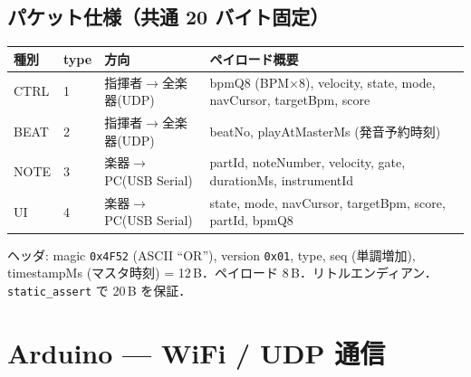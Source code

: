 \documentclass[uplatex,dvipdfmx,a4paper,10pt]{jsarticle}
\begin{document}
\subsection{パケット仕様（共通 20 バイト固定）}

\begin{tabularx}{\textwidth}{lllX}
\toprule
種別 & type & 方向 & ペイロード概要 \\
\midrule
CTRL & 1 & 指揮者$\to$全楽器(UDP) & bpmQ8 (BPM$\times$8), velocity, state, mode, navCursor, targetBpm, score \\
BEAT & 2 & 指揮者$\to$全楽器(UDP) & beatNo, playAtMasterMs (発音予約時刻) \\
NOTE & 3 & 楽器$\to$PC(USB Serial) & partId, noteNumber, velocity, gate, durationMs, instrumentId \\
UI   & 4 & 楽器$\to$PC(USB Serial) & state, mode, navCursor, targetBpm, score, partId, bpmQ8 \\
\bottomrule
\end{tabularx}

ヘッダ: magic \texttt{0x4F52} (ASCII ``OR''), version \texttt{0x01}, type, seq (単調増加), timestampMs (マスタ時刻) = 12\,B．ペイロード 8\,B．リトルエンディアン．\texttt{static\_assert} で 20\,B を保証．

\section{Arduino — WiFi / UDP 通信}
\end{document}
